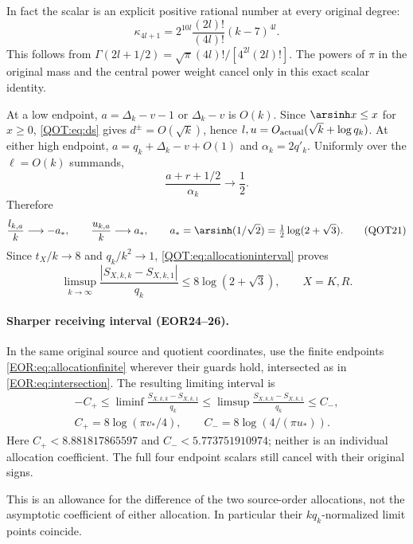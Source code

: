 \documentclass[11pt,a4paper]{article}
\begin{document}
In fact the scalar is an explicit positive rational number at every original degree:
\begin{equation}
 \boxed{\qquad
 \kappa_{4l+1}=2^{10l}\frac{(2l)!}{(4l)!}(k-7)^{4l}.
 \qquad}\label{QOT:eq:kapparational}
\tag{QOT20}
\end{equation}
This follows from $\Gamma(2l+1/2)=\sqrt\pi(4l)!/[4^{2l}(2l)!]$.
The powers of $\pi$ in the original mass and the central power weight
cancel only in this exact scalar identity.


At a low endpoint, $a=\Delta_k-v-1$ or $\Delta_k-v$ is $O(k)$. Since $\arsinh x\le x$ for $x\ge0$, \eqref{QOT:eq:ds} gives $d^\pm=O(\sqrt k)$, hence $l,u=O_{\rm actual}(\sqrt k+\log q_k)$. At either high endpoint, $a=q_k+\Delta_k-v+O(1)$ and $\alpha_k=2q'_k$. Uniformly over the $\ell=O(k)$ summands,
\[
 \frac{a+r+1/2}{\alpha_k}\longrightarrow\frac12.
\]
Therefore
\begin{equation}
 \frac{l_{k,a}}k\longrightarrow-a_*,\qquad
 \frac{u_{k,a}}k\longrightarrow a_*,\qquad
 a_*=\arsinh(1/\sqrt2)=\tfrac12\log(2+\sqrt3).
 \label{QOT:eq:limits}
\tag{QOT21}
\end{equation}
Since $t_X/k\to8$ and $q_k/k^2\to1$, \eqref{QOT:eq:allocationinterval} proves
\begin{equation}
 \boxed{\quad
 \limsup_{k\to\infty}\frac{|S_{X,k,k}-S_{X,k,1}|}{q_k}
 \le 8\log(2+\sqrt3),\qquad X=K,R .\quad}
 \label{QOT:eq:allocationq}
\tag{QOT22}
\end{equation}
\paragraph{Sharper receiving interval (EOR24--26).}
In the same original source and quotient coordinates, use the finite endpoints
\eqref{EOR:eq:allocationfinite} wherever their guards hold, intersected as in
\eqref{EOR:eq:intersection}. The resulting limiting interval is
\[\begin{gathered}
 -C_+\le\liminf\frac{S_{X,k,k}-S_{X,k,1}}{q_k}
 \le\limsup\frac{S_{X,k,k}-S_{X,k,1}}{q_k}\le C_-,\\
 C_+=8\log(\pi v_*/4),\qquad C_-=8\log(4/(\pi u_*)).
\end{gathered}\]
Here $C_+<8.881817865597$ and $C_-<5.773751910974$; neither is an individual
allocation coefficient. The full four endpoint scalars still cancel with their
original signs.

This is an allowance for the difference of the two source-order allocations, not the asymptotic coefficient of either allocation. In particular their $kq_k$-normalized limit points coincide.
\end{document}
